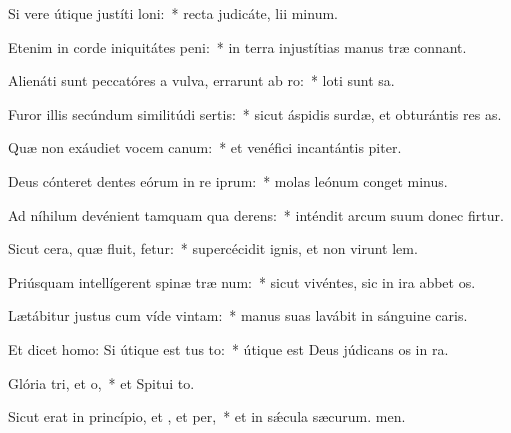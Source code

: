 \item Si vere útique justíti loni:~* recta judicáte, lii minum.
\item Etenim in corde iniquitátes peni:~* in terra injustítias manus træ connant.
\item Alienáti sunt peccatóres a vulva, errarunt ab ro:~* loti sunt sa.
\item Furor illis secúndum similitúdi sertis:~* sicut áspidis surdæ, et obturántis res as.
\item Quæ non exáudiet vocem canum:~* et venéfici incantántis piter.
\item Deus cónteret dentes eórum in re iprum:~* molas leónum conget minus.
\item Ad níhilum devénient tamquam qua derens:~* inténdit arcum suum donec firtur.
\item Sicut cera, quæ fluit, fetur:~* supercécidit ignis, et non virunt lem.
\item Priúsquam intellígerent spinæ træ num:~* sicut vivéntes, sic in ira abbet os.
\item Lætábitur justus cum víde vintam:~* manus suas lavábit in sánguine caris.
\item Et dicet homo: Si útique est tus to:~* útique est Deus júdicans os in ra.
\item Glória tri, et o,~* et Spitui to.
\item Sicut erat in princípio, et , et per,~* et in sǽcula sæcurum. men.

